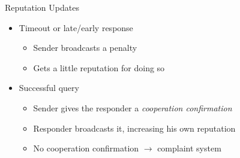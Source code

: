 \documentclass[presentation,english,usenames,dvipsnames]{beamer}
\begin{document}
\begin{frame}
\end{frame}

\begin{frame}{Reputation Updates}
  \begin{itemize}
    \item Timeout or late/early response
    \begin{itemize}
      \item Sender broadcasts a penalty
      \item Gets a little reputation for doing so
    \end{itemize}
    \item Successful query
    \begin{itemize}
      \item Sender gives the responder a \emph{cooperation confirmation}
      \item Responder broadcasts it, increasing his own reputation
      \item No cooperation confirmation $\rightarrow$ complaint system
    \end{itemize}
  \end{itemize}
\end{frame}
\end{document}
